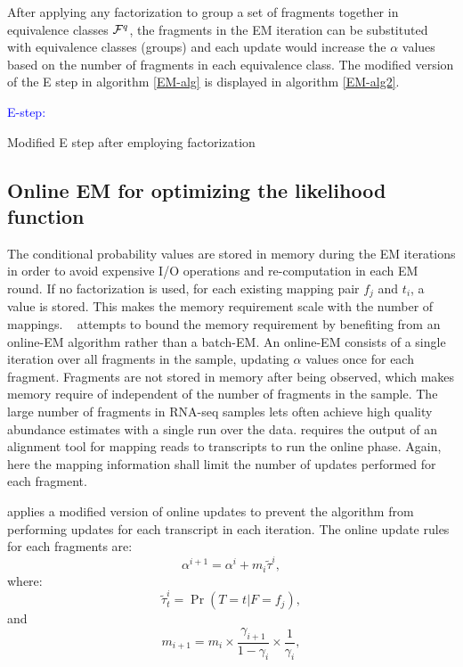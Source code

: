 After applying any factorization to group a set of fragments together 
in equivalence classes $\mathcal{F}^q$, the fragments in the EM iteration can 
be substituted with equivalence classes (groups) and each update would 
increase the $\alpha$ values based on the number of fragments in each 
equivalence class. The modified version of the E step 
in algorithm \ref{EM-alg} is displayed in algorithm \ref{EM-alg2}.

\begin{algorithm}[H]
\textcolor{blue}{E-step:} \\
\caption{Modified E step after employing factorization}
 \label{EM-alg2}
\end{algorithm}


\subsection{Online EM for optimizing the likelihood function}

The conditional probability values are stored in memory during the EM iterations 
in order to avoid expensive I/O operations and re-computation in each EM round. 
If no factorization is used, for each existing mapping pair $f_j$ and $t_i$, 
a value is stored. This makes the memory requirement scale with the number of 
mappings. \express~\citep{Roberts2013Express} attempts to bound the memory 
requirement by benefiting from an online-EM algorithm rather than a batch-EM. 
An online-EM consists of a single iteration over all fragments in the sample, 
updating $\alpha$ values once for each fragment. Fragments are not stored in 
memory after being observed, which makes memory require of \express 
independent of the number of fragments in the sample. The large number of 
fragments in RNA-seq samples lets \express often achieve high quality abundance 
estimates with a single run over the data. \express requires the output 
of an alignment tool for mapping reads to transcripts to run the online phase. 
Again, here the mapping information shall limit the number of updates performed 
for each fragment. 

\express applies a modified version of online updates to prevent the 
algorithm from performing updates for each transcript in each iteration. 
The online update rules for each fragments are:
\begin{equation}
\alpha^{i+1} = \alpha^{i}+m_i\tilde{\tau}^i,
\label{eqn:online1}
\end{equation}
where:
\begin{equation}
\tilde{\tau}^i_t =\Pr{(T=t|F=f_j)},
\label{eqn:online2}
\end{equation}
and
\begin{equation}
m_{i+1} = m_i \times \frac{\gamma_{i+1}}{1-\gamma_i} \times \frac{1}{\gamma_i},
\label{eqn:online3}
\end{equation}

